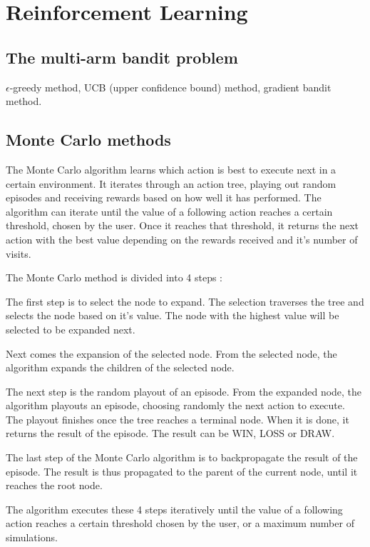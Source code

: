 \documentclass{book}
\begin{document}
\section{Reinforcement Learning}

\subsection{The multi-arm bandit problem}

$\epsilon$-greedy method, UCB (upper confidence bound) method, gradient bandit method.

\subsection{Monte Carlo methods}

The Monte Carlo algorithm learns which action is best to execute next in a certain environment. It iterates through an action tree, playing out random episodes and receiving rewards based on how well it has performed. The algorithm can iterate until the value of a following action reaches a certain threshold, chosen by the user. Once it reaches that threshold, it returns the next action with the best value depending on the rewards received and it's number of visits.

The Monte Carlo method is divided into 4 steps :

The first step is to select the node to expand. The selection traverses the tree and selects the node based on it's value. The node with the highest value will be selected to be expanded next.

Next comes the expansion of the selected node. From the selected node, the algorithm expands the children of the selected node.

The next step is the random playout of an episode. From the expanded node, the algorithm playouts an episode, choosing randomly the next action to execute. The playout finishes once the tree reaches a terminal node. When it is done, it returns the result of the episode. The result can be WIN, LOSS or DRAW.

The last step of the Monte Carlo algorithm is to backpropagate the result of the episode. The result is thus propagated to the parent of the current node, until it reaches the root node.

The algorithm executes these 4 steps iteratively until the value of a following action reaches a certain threshold chosen by the user, or a maximum number of simulations. 
\end{document}
